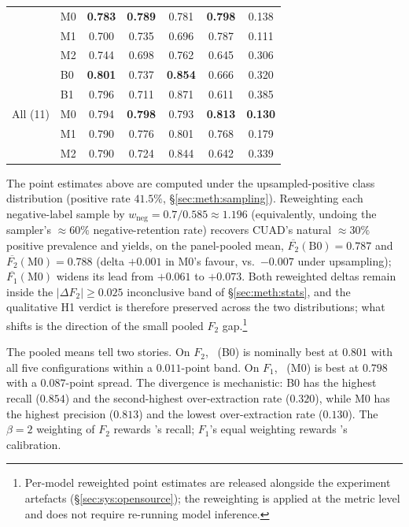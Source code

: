 \begin{table}[htbp]
\begin{tabular*}{\linewidth}{@{\extracolsep{\fill}}llccccc@{}}
      & M0 & \textbf{0.783} & \textbf{0.789} & 0.781 & \textbf{0.798} & 0.138 \\
      & M1 & 0.700 & 0.735 & 0.696 & 0.787 & 0.111 \\
      & M2 & 0.744 & 0.698 & 0.762 & 0.645 & 0.306 \\
    \midrule
    \multirow{5}{*}{All (11)}
      & B0 & \textbf{0.801} & 0.737 & \textbf{0.854} & 0.666 & 0.320 \\
      & B1 & 0.796 & 0.711 & 0.871 & 0.611 & 0.385 \\
      & M0 & 0.794 & \textbf{0.798} & 0.793 & \textbf{0.813} & \textbf{0.130} \\
      & M1 & 0.790 & 0.776 & 0.801 & 0.768 & 0.179 \\
      & M2 & 0.790 & 0.724 & 0.844 & 0.642 & 0.339 \\
    \bottomrule
  \end{tabular*}
\end{table}

The point estimates above are computed under the upsampled-positive class
distribution (positive rate $41.5\%$, \S\ref{sec:meth:sampling}). Reweighting
each negative-label sample by $w_{\text{neg}} = 0.7/0.585 \approx 1.196$
(equivalently, undoing the sampler's $\approx 60\%$ negative-retention rate)
recovers CUAD's natural ${\approx}30\%$ positive prevalence and yields, on
the panel-pooled mean, $\overline{F_2}(\text{B0}) = 0.787$ and
$\overline{F_2}(\text{M0}) = 0.788$ (delta $+0.001$ in M0's favour, vs.\
$-0.007$ under upsampling); $\overline{F_1}(\text{M0})$ widens its lead from
$+0.061$ to $+0.073$. Both reweighted deltas remain inside the
$|\Delta F_2| \geq 0.025$ inconclusive band of \S\ref{sec:meth:stats}, and
the qualitative H1 verdict is therefore preserved across the two
distributions; what shifts is the direction of the small pooled $F_2$
gap.\footnote{Per-model reweighted point estimates are released alongside
the experiment artefacts (\S\ref{sec:sys:opensource}); the reweighting is
applied at the metric level and does not require re-running model inference.}

The pooled means tell two stories. On $F_2$, \cfgZS\ (B0) is nominally best
at $0.801$ with all five configurations within a $0.011$-point band. On $F_1$,
\cfgCX\ (M0) is best at $0.798$ with a $0.087$-point spread. The divergence is
mechanistic: B0 has the highest recall ($0.854$) and the second-highest
over-extraction rate ($0.320$), while M0 has the highest precision ($0.813$) and
the lowest over-extraction rate ($0.130$). The $\beta{=}2$ weighting of $F_2$
rewards \cfgZS's recall; $F_1$'s equal weighting rewards \cfgCX's calibration.

